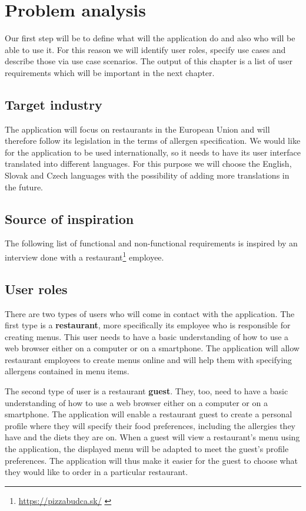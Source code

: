 \chapter{Problem analysis}
Our first step will be to define what will the application do and also who will be able to use it.
For this reason we will identify user roles, specify use cases and describe those via use case scenarios.
The output of this chapter is a list of user requirements which will be important in the next chapter.

\section{Target industry}
The application will focus on restaurants in the European Union and will therefore follow its legislation in the terms of allergen specification.
We would like for the application to be used internationally, so it needs to have its user interface translated into different languages.
For this purpose we will choose the English, Slovak and Czech languages with the possibility of adding more translations in the future.

\section{Source of inspiration}
The following list of functional and non-functional requirements is inspired by an interview done with a restaurant\footnote{\url{https://pizzabudca.sk/}  \label{fnlabel}} employee.

\section{User roles}
There are two types of users who will come in contact with the application.
The first type is a \textbf{restaurant}, more specifically its employee who is responsible for creating menus.
This user needs to have a basic understanding of how to use a web browser either on a computer or on a smartphone.
The application will allow restaurant employees to create menus online and will help them with specifying allergens contained in menu items.

The second type of user is a restaurant \textbf{guest}.
They, too, need to have a basic understanding of how to use a web browser either on a computer or on a smartphone.
The application will enable a restaurant guest to create a personal profile where they will specify their food preferences, including the allergies they have and the diets they are on.
When a guest will view a restaurant's menu using the application, the displayed menu will be adapted to meet the guest's profile preferences.
The application will thus make it easier for the guest to choose what they would like to order in a particular restaurant.

